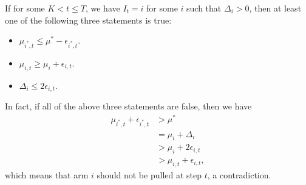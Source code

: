 \documentclass[openany]{book}
\theoremstyle{definition}
\theoremstyle{remark}
\begin{document}
If for some $K<t\le T$, we have $I_t=i$ for some $i$ such that $\Delta_i>0$, then at least one of the following three statements is true:
\begin{itemize}
    \item $\mu_{i^*,t}\le\mu^*-\epsilon_{i^*,t}$.
    \item $\mu_{i,t}\ge\mu_i+\epsilon_{i,t}$.
    \item $\Delta_i\le2\epsilon_{i,t}$.
\end{itemize}
In fact, if all of the above three statements are false, then we have
\begin{align*}
    \mu_{i^*,t}+\epsilon_{i^*,t} & >\mu^* \\
     & =\mu_i+\Delta_i \\
     & >\mu_i+2\epsilon_{i,t} \\
     & >\mu_{i,t}+\epsilon_{i,t},
\end{align*}
which means that arm $i$ should not be pulled at step $t$, a contradiction.
\end{document}
